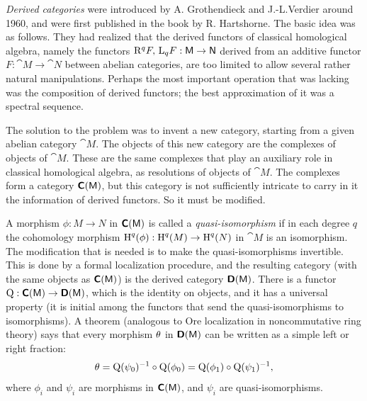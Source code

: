  
\renewcommand{\thisfile}{block0\_190328}
 
\cleardoublepage
\setcounter{section}{-1}
\AYcopyright


 \label{subsec:on-the-sub}
{\em Derived categories} were introduced by A. Grothendieck and J.-L.Verdier 
around 1960, and were first published in the book \cite{RD} by R. 
Hartshorne. The basic idea was as follows. They had realized that the derived 
functors of classical homological algebra, namely the functors 
$\mathrm{R}^q F, \, \mathrm{L}_q F : \operatorname{\mathsf{M}} \to \operatorname{\mathsf{N}}$ 
derived from an additive functor 
$F : \cat{M} \to \cat{N}$
between abelian categories, are too limited to allow several rather natural 
manipulations. Perhaps the most important operation that was lacking was the 
composition of derived functors; the best approximation of it was a spectral 
sequence. 

The solution to the problem was to invent a new category, starting from a given 
abelian category $\cat{M}$. The objects of this new category are the complexes 
of objects of $\cat{M}$. These are the same complexes that play an auxiliary 
role in classical homological algebra, as resolutions of objects of $\cat{M}$. 
The complexes form a category $\boldsymbol{\mathsf{C}}(\operatorname{\mathsf{M}})$, but this category is not 
sufficiently intricate to carry in it the information of derived 
functors. So it must be modified. 

A morphism $\phi : M \to N$ in $\boldsymbol{\mathsf{C}}(\operatorname{\mathsf{M}})$
is called a {\em quasi-isomorphism}
if in each degree $q$ the cohomology morphism 
$\operatorname{H}^q(\phi) : \operatorname{H}^q(M) \to \operatorname{H}^q(N)$
in $\cat{M}$ is an isomorphism. The modification that is needed is to make the 
quasi-isomorphisms invertible. This is done by a formal 
localization procedure, and the resulting category (with the same objects as 
$\boldsymbol{\mathsf{C}}(\operatorname{\mathsf{M}})$) is the derived category $\boldsymbol{\mathsf{D}}(\operatorname{\mathsf{M}})$.
There is a functor 
$\operatorname{Q} : \boldsymbol{\mathsf{C}}(\operatorname{\mathsf{M}}) \to \boldsymbol{\mathsf{D}}(\operatorname{\mathsf{M}})$,
which is the identity on objects, and it has a universal property (it is 
initial among the functors that send the quasi-isomorphisms to isomorphisms).  
A theorem (analogous to Ore localization in noncommutative ring theory) says 
that every morphism $\theta$ in $\boldsymbol{\mathsf{D}}(\operatorname{\mathsf{M}})$ can be written as a simple 
left 
or right fraction:
\begin{equation} \label{eqn:4994}
\theta = \operatorname{Q}(\psi_0)^{-1} \circ \operatorname{Q}(\phi_0) = 
\operatorname{Q}(\phi_1) \circ \operatorname{Q}(\psi_1)^{-1} ,
\end{equation}
where $\phi_i$ and $\psi_i$ are morphisms in $\boldsymbol{\mathsf{C}}(\operatorname{\mathsf{M}})$, and 
$\psi_i$ are quasi-isomorphisms. 

